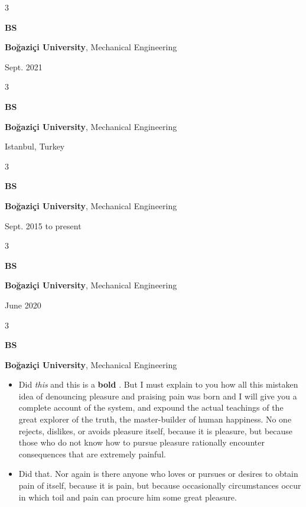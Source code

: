 \documentclass[10pt, letterpaper]{article}
\newenvironment{highlights}{
    \begin{itemize}[
        topsep=0.10 cm,
        parsep=0.10 cm,
        partopsep=0pt,
        itemsep=0pt,
        leftmargin=0.4 cm + 10pt
    ]
}{
    \end{itemize}
} %
\newenvironment{threecolentry}[3][]{
    \onecolentry
    \def\thirdColumn{#3}
    \setcolumnwidth{1 cm, \fill, 4.5 cm}
    \begin{paracol}{3}
    {\raggedright #2} \switchcolumn
}{
    \switchcolumn \raggedleft \thirdColumn
    \end{paracol}
    \endonecolentry
} %
\let\hrefWithoutArrow\href
\renewcommand{\href}[2]{\hrefWithoutArrow{#1}{\mbox{\ifthenelse{\equal{#2}{}}{ }{#2 }\raisebox{.15ex}{\footnotesize \faExternalLink*}}}}
\begin{document}
        \vspace{0.2 cm}

        \begin{threecolentry}{\textbf{BS}}{
            Sept. 2021
        }
            \textbf{Boğaziçi University}, Mechanical Engineering
        \end{threecolentry}

        \vspace{0.2 cm}

        \begin{threecolentry}{\textbf{BS}}{
            Istanbul, Turkey
        }
            \textbf{Boğaziçi University}, Mechanical Engineering
        \end{threecolentry}

        \vspace{0.2 cm}

        \begin{threecolentry}{\textbf{BS}}{
            Sept. 2015 to present
        }
            \textbf{Boğaziçi University}, Mechanical Engineering
        \end{threecolentry}

        \vspace{0.2 cm}

        \begin{threecolentry}{\textbf{BS}}{
            June 2020
        }
            \textbf{Boğaziçi University}, Mechanical Engineering
        \end{threecolentry}

        \vspace{0.2 cm}

        \begin{threecolentry}{\textbf{BS}}{
            
        }
            \textbf{Boğaziçi University}, Mechanical Engineering
            \begin{highlights}
                \item Did \textit{this} and this is a \textbf{bold} \href{https://example.com}{link}. But I must explain to you how all this mistaken idea of denouncing pleasure and praising pain was born and I will give you a complete account of the system, and expound the actual teachings of the great explorer of the truth, the master-builder of human happiness. No one rejects, dislikes, or avoids pleasure itself, because it is pleasure, but because those who do not know how to pursue pleasure rationally encounter consequences that are extremely painful.
                \item Did that. Nor again is there anyone who loves or pursues or desires to obtain pain of itself, because it is pain, but because occasionally circumstances occur in which toil and pain can procure him some great pleasure.
            \end{highlights}
        \end{threecolentry}
\end{document}
